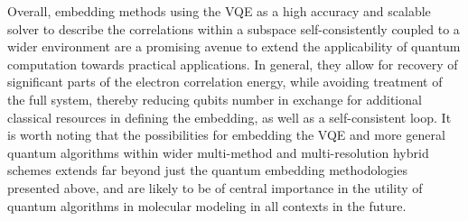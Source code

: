 Overall, embedding methods using the VQE as a high accuracy and scalable solver to describe the correlations within a subspace self-consistently coupled to a wider environment are a promising avenue to extend the applicability of quantum computation towards practical applications. In general, they allow for recovery of significant parts of the electron correlation energy, while avoiding treatment of the full system, thereby reducing qubits number in exchange for additional classical resources in defining the embedding, as well as a self-consistent loop. It is worth noting that the possibilities for embedding the VQE and more general quantum algorithms within wider multi-method and multi-resolution hybrid schemes extends far beyond just the quantum embedding methodologies presented above, and are likely to be of central importance in the utility of quantum algorithms in molecular modeling in all contexts in the future.